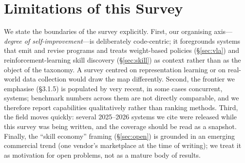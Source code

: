 \section{Limitations of this Survey}
\label{sec:limitations}

We state the boundaries of the survey explicitly. First, our organising axis---\emph{degree
of self-improvement}---is deliberately code-centric; it foregrounds systems that emit and
revise programs and treats weight-based policies (\S\ref{sec:vla}) and reinforcement-learning
skill discovery (\S\ref{sec:skill}) as context rather than as the object of the taxonomy.
A survey centred on representation learning or on real-world data collection would draw the
map differently. Second, the frontier we emphasise (\S3.1.5) is populated by very recent,
in some cases concurrent, systems; benchmark numbers across them are not directly
comparable, and we therefore report capabilities qualitatively rather than ranking methods.
Third, the field moves quickly: several 2025--2026 systems we cite were released while this
survey was being written, and the coverage should be read as a snapshot. Finally, the
``skill economy'' framing (\S\ref{sec:open}) is grounded in an emerging commercial trend
(one vendor's marketplace at the time of writing); we treat it as motivation for open
problems, not as a mature body of results.
